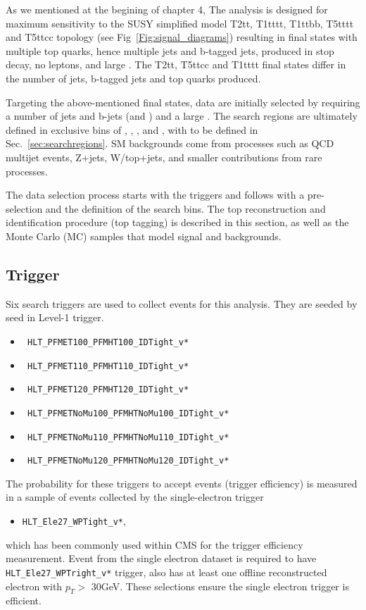 As we mentioned at the begining of chapter 4, The analysis is designed for maximum sensitivity to the SUSY simplified model T2tt, T1tttt, T1ttbb, T5tttt and T5ttcc topology (see Fig~\ref{Fig:signal_diagrams}) resulting in final states with multiple top quarks, hence multiple jets and b-tagged jets, produced in stop decay, no leptons, and large \MET. The T2tt, T5ttcc and T1tttt final states differ in the number of jets, b-tagged jets and top quarks produced. 

Targeting the above-mentioned final states, data are initially selected 
by requiring a number of jets and b-jets (\njets and \nbjets) and a large \MET. 
The search regions are ultimately defined in exclusive bins of 
\ntops, \nbjets, \HT, \MET and \MTTwo, with \MTTwo to be defined in 
Sec.~\ref{sec:searchregions}. SM backgrounds come from processes such as QCD
multijet events, Z+jets, W/top+jets, and smaller contributions from rare
processes.

The data selection process starts with the triggers and follows with a 
pre-selection and the definition of the search bins. The top reconstruction
and identification procedure (top tagging) is described in this section, 
as well as the Monte Carlo (MC) samples that model signal and backgrounds.

\subsection{Trigger}
\label{sec:trig}
Six search triggers are used to collect events for this analysis. They are
seeded by \MET seed in Level-1 trigger. 
\begin{itemize}
\item \texttt{ HLT\_PFMET100\_PFMHT100\_IDTight\_v*}
\item \texttt{ HLT\_PFMET110\_PFMHT110\_IDTight\_v*}
\item \texttt{ HLT\_PFMET120\_PFMHT120\_IDTight\_v*}
\item \texttt{ HLT\_PFMETNoMu100\_PFMHTNoMu100\_IDTight\_v*} 
\item \texttt{ HLT\_PFMETNoMu110\_PFMHTNoMu110\_IDTight\_v* }
\item \texttt{ HLT\_PFMETNoMu120\_PFMHTNoMu120\_IDTight\_v*}
\end{itemize}

The probability for these triggers to accept events (trigger efficiency) is
measured in a sample of events collected by the single-electron trigger
\begin{itemize}
  \item \texttt{HLT\_Ele27\_WPTight\_v*},
\end{itemize}
which has been commonly used within CMS for the \MET trigger efficiency measurement. 
Event from the single electron dataset is required to have
\texttt{HLT\_Ele27\_WPTright\_v*} trigger, also has at least one offline
reconstructed electron with $p_{T}>$ 30GeV. These selections ensure the single
electron trigger is efficient. 

